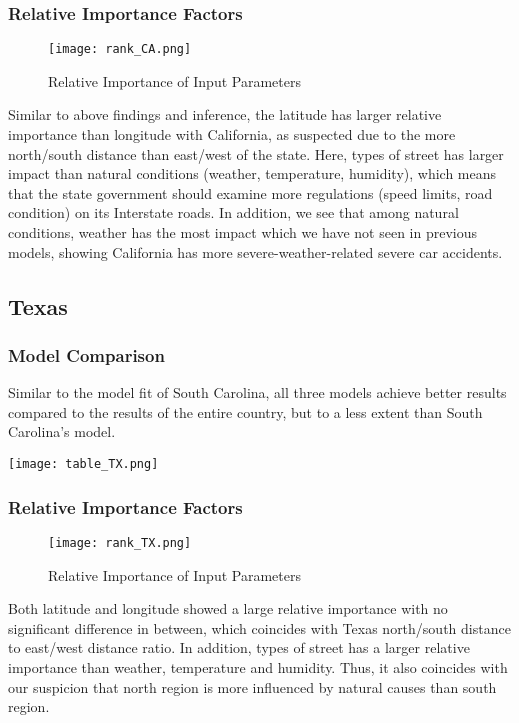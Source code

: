 \documentclass[twocolumn]{article}
\begin{document}
\subsubsection{Relative Importance Factors}
\begin{figure}[h]
    \centering
    \texttt{[image: rank\_CA.png]}
    \caption{Relative Importance of Input Parameters}
\end{figure}
Similar to above findings and inference, the latitude has larger relative importance than longitude with California, as suspected due to the more north/south distance than east/west of the state. Here, types of street has larger impact than natural conditions (weather, temperature, humidity), which means that the state government should examine more regulations (speed limits, road condition) on its Interstate roads. In addition, we see that among natural conditions, weather has the most impact which we have not seen in previous models, showing California has more severe-weather-related severe car accidents.


\subsection{Texas}
\subsubsection{Model Comparison}
Similar to the model fit of South Carolina, all three models achieve better results compared to the results of the entire country, but to a less extent than South Carolina's model. 
\begin{table}[h]
    \centering
    \texttt{[image: table\_TX.png]}
    \caption{}
\end{table}
\subsubsection{Relative Importance Factors}
\begin{figure}[h]
    \centering
    \texttt{[image: rank\_TX.png]}
    \caption{Relative Importance of Input Parameters}
\end{figure}
Both latitude and longitude showed a large relative importance with no significant difference in between, which coincides with Texas north/south distance to east/west distance ratio. In addition, types of street has a larger relative importance than weather, temperature and humidity. Thus, it also coincides with our suspicion that north region is more influenced by natural causes than south region. 
\end{document}
